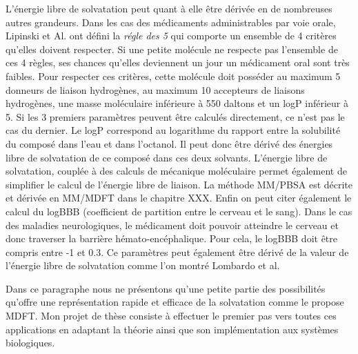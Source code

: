L'énergie libre de solvatation peut quant à elle être dérivée en de nombreuses autres grandeurs. Dans les cas des médicaments administrables par voie orale, Lipinski et Al.\cite{Lipinski_lead_2004} ont défini la \textit{régle des 5} qui comporte un ensemble de 4 critères qu'elles doivent respecter. Si une petite molécule ne respecte pas l'ensemble de ces 4 règles, ses chances qu'elles deviennent un jour un médicament oral sont très faibles. Pour respecter ces critères, cette molécule doit posséder au maximum 5 donneurs de liaison hydrogènes, au maximum 10 accepteurs de liaisons hydrogènes, une masse moléculaire inférieure à 550 daltons et un logP inférieur à 5. Si les 3 premiers paramètres peuvent être calculés directement, ce n'est pas le cas du dernier. Le logP correspond au logarithme du rapport entre la solubilité du composé dans l'eau et dans l'octanol. Il peut donc être dérivé des énergies libre de solvatation de ce composé dans ces deux solvants. L'énergie libre de solvatation, couplée à des calculs de mécanique moléculaire permet également de simplifier le calcul de l'énergie libre de liaison. La méthode MM/PBSA\cite{Genheden__MMPBSA_2015} est décrite et dérivée en MM/MDFT dans le chapitre XXX. Enfin on peut citer également le calcul du logBBB (coefficient de partition entre le cerveau et le sang). Dans le cas des maladies neurologiques, le médicament doit pouvoir atteindre le cerveau et donc traverser la barrière hémato-encéphalique. Pour cela, le logBBB doit être compris entre -1 et 0.3\cite{Vilar_prediction_2010}. Ce paramètres peut également être dérivé de la valeur de l'énergie libre de solvatation comme l'on montré Lombardo et al\cite{Lombardo_computation_1996}.

Dans ce paragraphe nous ne présentons qu'une petite partie des possibilités qu'offre une représentation rapide et efficace de la solvatation comme le propose MDFT. Mon projet de thèse consiste à effectuer le premier pas vers toutes ces applications en adaptant la théorie ainsi que son implémentation aux systèmes biologiques.




\vspace{8\baselineskip}




